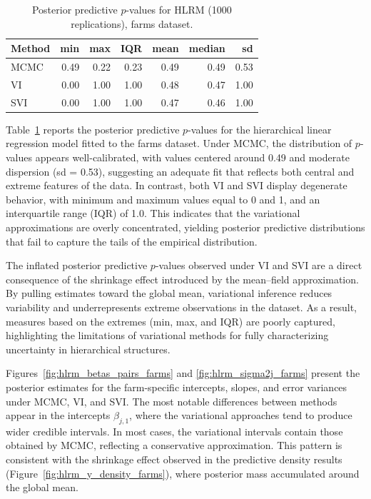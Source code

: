 \begin{table}[!h]
\centering
\caption{\label{tab:PPvalsHLRM}Posterior predictive $p$-values for HLRM (1000 replications), farms dataset.}
\centering
\begin{tabular}[t]{lrrrrrr}
\toprule
\textbf{Method} & \textbf{min} & \textbf{max} & \textbf{IQR} & \textbf{mean} & \textbf{median} & \textbf{sd} \\
\midrule
MCMC & 0.49 & 0.22 & 0.23 & 0.49 & 0.49 & 0.53\\
VI & 0.00 & 1.00 & 1.00 & 0.48 & 0.47 & 1.00\\
SVI & 0.00 & 1.00 & 1.00 & 0.47 & 0.46 & 1.00\\
\bottomrule
\end{tabular}
\end{table}

\newpage

Table~\ref{tab:PPvalsHLRM} reports the posterior predictive $p$-values for the hierarchical linear regression model fitted to the farms dataset. Under MCMC, the distribution of $p$-values appears well-calibrated, with values centered around 0.49 and moderate dispersion (sd = 0.53), suggesting an adequate fit that reflects both central and extreme features of the data. In contrast, both VI and SVI display degenerate behavior, with minimum and maximum values equal to 0 and 1, and an interquartile range (IQR) of 1.0. This indicates that the variational approximations are overly concentrated, yielding posterior predictive distributions that fail to capture the tails of the empirical distribution.  

\vspace{0.5cm}

The inflated posterior predictive $p$-values observed under VI and SVI are a direct consequence of the shrinkage effect introduced by the mean--field approximation. By pulling estimates toward the global mean, variational inference reduces variability and underrepresents extreme observations in the dataset. As a result, measures based on the extremes (min, max, and IQR) are poorly captured, highlighting the limitations of variational methods for fully characterizing uncertainty in hierarchical structures.

\vspace{0.5cm}

Figures~\ref{fig:hlrm_betas_pairs_farms} and \ref{fig:hlrm_sigma2j_farms} present the posterior estimates for the farm-specific intercepts, slopes, and error variances under MCMC, VI, and SVI. The most notable differences between methods appear in the intercepts $\beta_{j,1}$, where the variational approaches tend to produce wider credible intervals. In most cases, the variational intervals contain those obtained by MCMC, reflecting a conservative approximation. This pattern is consistent with the shrinkage effect observed in the predictive density results (Figure~\ref{fig:hlrm_y_density_farms}), where posterior mass accumulated around the global mean. 

